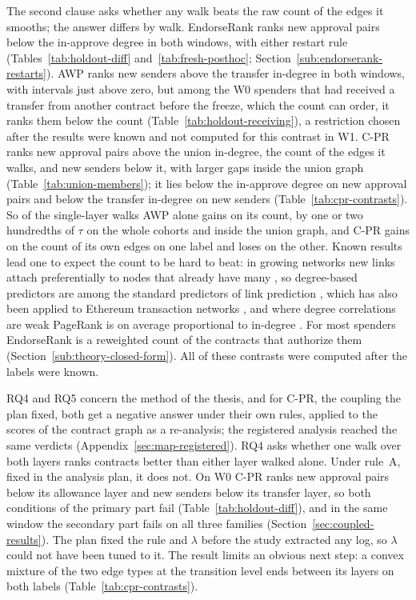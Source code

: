 The second clause asks whether any walk beats the raw count of the edges it smooths; the answer differs by walk. EndorseRank ranks new approval pairs below the in-approve degree in both windows, with either restart rule (Tables~\ref{tab:holdout-diff} and~\ref{tab:fresh-posthoc}; Section~\ref{sub:endorserank-restarts}). AWP ranks new senders above the transfer in-degree in both windows, with intervals just above zero, but among the W0 spenders that had received a transfer from another contract before the freeze, which the count can order, it ranks them below the count (Table~\ref{tab:holdout-receiving}), a restriction chosen after the results were known and not computed for this contrast in W1. \mbox{C-PR} ranks new approval pairs above the union in-degree, the count of the edges it walks, and new senders below it, with larger gaps inside the union graph (Table~\ref{tab:union-members}); it lies below the in-approve degree on new approval pairs and below the transfer in-degree on new senders (Table~\ref{tab:cpr-contrasts}). So of the single-layer walks AWP alone gains on its count, by one or two hundredths of $\tau$ on the whole cohorts and inside the union graph, and \mbox{C-PR} gains on the count of its own edges on one label and loses on the other. Known results lead one to expect the count to be hard to beat: in growing networks new links attach preferentially to nodes that already have many \parencite{barabasi1999scaling}, so degree-based predictors are among the standard predictors of link prediction \parencite{libennowell2007link}, which has also been applied to Ethereum transaction networks \parencite{lin2022tracking}, and where degree correlations are weak PageRank is on average proportional to in-degree \parencite{fortunato2008indegree}. For most spenders EndorseRank is a reweighted count of the contracts that authorize them (Section~\ref{sub:theory-closed-form}). All of these contrasts were computed after the labels were known.


RQ4 and RQ5 concern the method of the thesis, and for \mbox{C-PR}, the coupling the plan fixed, both get a negative answer under their own rules, applied to the scores of the contract graph as a re-analysis; the registered analysis reached the same verdicts (Appendix~\ref{sec:map-registered}). RQ4 asks whether one walk over both layers ranks contracts better than either layer walked alone. Under rule~A, fixed in the analysis plan, it does not. On W0 \mbox{C-PR} ranks new approval pairs below its allowance layer and new senders below its transfer layer, so both conditions of the primary part fail (Table~\ref{tab:holdout-diff}), and in the same window the secondary part fails on all three families (Section~\ref{sec:coupled-results}). The plan fixed the rule and $\lambda$ before the study extracted any log, so $\lambda$ could not have been tuned to it. The result limits an obvious next step: a convex mixture of the two edge types at the transition level ends between its layers on both labels (Table~\ref{tab:cpr-contrasts}).

